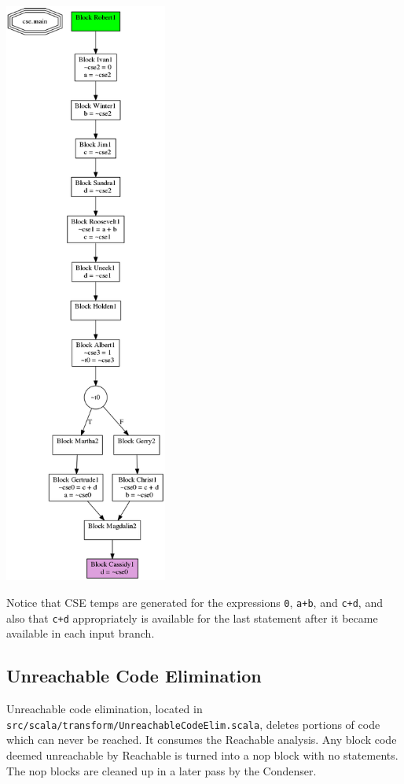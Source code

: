 \documentclass[11pt]{article}
\begin{document}
  \includegraphics[width=0.4\textwidth]{./after_cse.png}

  Notice that CSE temps are generated for the expressions \verb~0~, \verb~a+b~, and \verb~c+d~, and also that \verb~c+d~
  appropriately is available for the last statement after it became available in each input branch. 
\subsection{Unreachable Code Elimination}
\label{sec-3-2}

    Unreachable code elimination, located in \verb~src/scala/transform/UnreachableCodeElim.scala~, 
    deletes portions of code which can never be reached. It consumes the Reachable analysis. Any 
    block code deemed unreachable by Reachable is turned into a nop block with no statements. The 
    nop blocks are cleaned up in a later pass by the Condenser.
\end{document}
